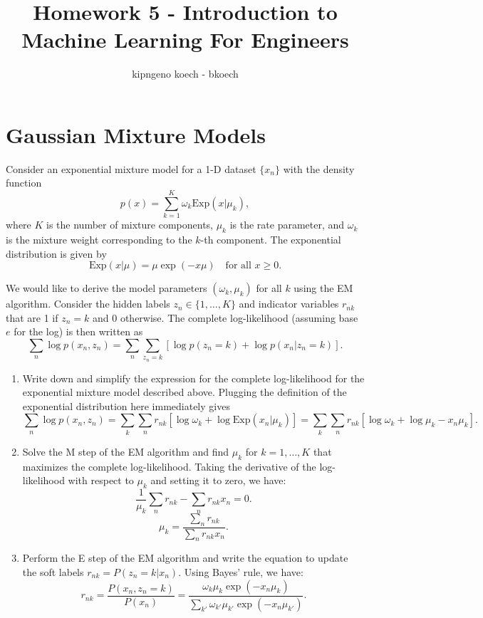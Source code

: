 \documentclass[a3paper,12pt]{extarticle} %
\begin{document}
\author{kipngeno koech - bkoech}
\title{Homework 5 - Introduction to Machine Learning For Engineers}   
\maketitle

\medskip

\maketitle
\section{Gaussian Mixture Models}
Consider an exponential mixture model for a 1-D dataset $\{x_n\}$ with the density function
\[
p(x) = \sum_{k=1}^K \omega_k \text{Exp}(x|\mu_k),
\]
where $K$ is the number of mixture components, $\mu_k$ is the rate parameter, and $\omega_k$ is the mixture weight corresponding to the $k$-th component. The exponential distribution is given by
\[
\text{Exp}(x|\mu) = \mu \exp(-x\mu) \quad \text{for all } x \geq 0. \tag{1}
\]

We would like to derive the model parameters $(\omega_k, \mu_k)$ for all $k$ using the EM algorithm. Consider the hidden labels $z_n \in \{1, \ldots, K\}$ and indicator variables $r_{nk}$ that are 1 if $z_n = k$ and 0 otherwise. The complete log-likelihood (assuming base $e$ for the log) is then written as
\[
\sum_n \log p(x_n, z_n) = \sum_n \sum_{z_n=k} \left[\log p(z_n = k) + \log p(x_n|z_n = k)\right].
\]

\begin{enumerate}
    \item Write down and simplify the expression for the complete log-likelihood for the exponential
    mixture model described above. Plugging the definition of the exponential distribution here immediately gives
    \[
    \sum_n \log p(x_n, z_n) = \sum_k \sum_n r_{nk} \left[\log \omega_k + \log \text{Exp}(x_n|\mu_k)\right]
    = \sum_k \sum_n r_{nk} \left[\log \omega_k + \log \mu_k - x_n \mu_k\right].
    \]
   \item  Solve the M step of the EM algorithm and find $\mu_k$ for $k = 1, \ldots, K$ that maximizes the complete log-likelihood. Taking the derivative of the log-likelihood with respect to $\mu_k$ and setting it to zero, we have:
    \[
    \frac{1}{\mu_k} \sum_n r_{nk} - \sum_n r_{nk} x_n = 0. \tag{2}
    \]
    \[
    \mu_k = \frac{\sum_n r_{nk}}{\sum_n r_{nk} x_n}. \tag{3}
    \]
    \item Perform the E step of the EM algorithm and write the equation to update the soft labels $r_{nk} = P(z_n = k|x_n)$. Using Bayes' rule, we have:
    \[
    r_{nk} = \frac{P(x_n, z_n = k)}{P(x_n)} = \frac{\omega_k \mu_k \exp(-x_n \mu_k)}{\sum_{k'} \omega_{k'} \mu_{k'} \exp(-x_n \mu_{k'})}.
    \]
\end{enumerate}
\end{document}
